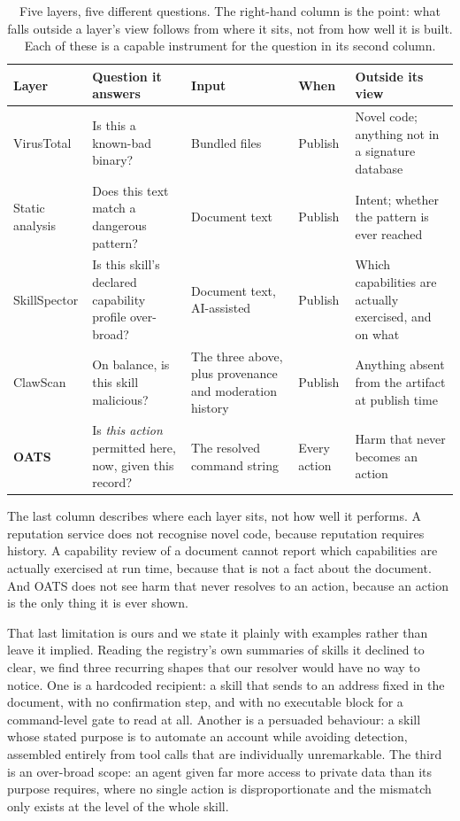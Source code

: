 \documentclass[10pt]{article}
\begin{document}
\begin{table}[H]
\centering
\small
\begin{tabular}{p{2.1cm}p{3.6cm}p{2.5cm}p{2.0cm}p{3.0cm}}
\toprule
Layer & Question it answers & Input & When & Outside its view \\
\midrule
VirusTotal &
Is this a known-bad binary? &
Bundled files &
Publish &
Novel code; anything not in a signature database \\[2pt]
Static analysis &
Does this text match a dangerous pattern? &
Document text &
Publish &
Intent; whether the pattern is ever reached \\[2pt]
SkillSpector &
Is this skill's declared capability profile over-broad? &
Document text, AI-assisted &
Publish &
Which capabilities are actually exercised, and on what \\[2pt]
ClawScan &
On balance, is this skill malicious? &
The three above, plus provenance and moderation history &
Publish &
Anything absent from the artifact at publish time \\[2pt]
\textbf{OATS} &
Is \emph{this action} permitted here, now, given this record? &
The resolved command string &
Every action &
Harm that never becomes an action \\
\bottomrule
\end{tabular}
\caption{Five layers, five different questions. The right-hand column is the point:
what falls outside a layer's view follows from where it sits, not from how well it is
built. Each of these is a capable instrument for the question in its second column.}
\label{tab:layers}
\end{table}

The last column describes where each layer sits, not how well it performs. A
reputation service does not recognise novel code, because reputation requires
history. A capability review of a document cannot report which capabilities are
actually exercised at run time, because that is not a fact about the document. And
OATS does not see harm that never resolves to an action, because an action is the
only thing it is ever shown.

That last limitation is ours and we state it plainly with examples rather than leave
it implied. Reading the registry's own summaries of skills it declined to clear, we
find three recurring shapes that our resolver would have no way to notice. One is a
hardcoded recipient: a skill that sends to an address fixed in the document, with no
confirmation step, and with no executable block for a command-level gate to read at
all. Another is a persuaded behaviour: a skill whose stated purpose is to automate an
account while avoiding detection, assembled entirely from tool calls that are
individually unremarkable. The third is an over-broad scope: an agent given far more
access to private data than its purpose requires, where no single action is
disproportionate and the mismatch only exists at the level of the whole skill.
\end{document}
